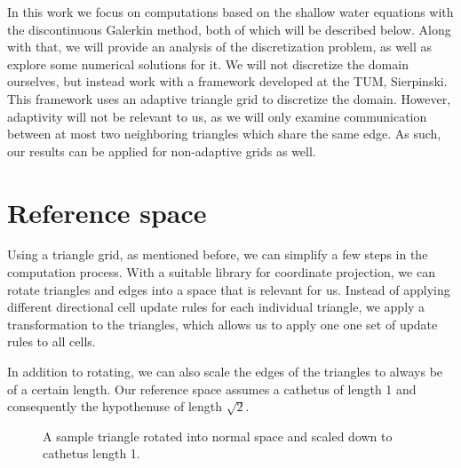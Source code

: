 \documentclass{article}
\begin{document}
In this work we focus on computations based on the shallow water equations with the discontinuous Galerkin method, both of which will be described below.
Along with that, we will provide an analysis of the discretization problem, as well as explore some numerical solutions for it.
We will not discretize the domain ourselves, but instead work with a framework developed at the TUM, Sierpinski.
This framework uses an adaptive triangle grid to discretize the domain.
However, adaptivity will not be relevant to us, as we will only examine communication between at most two neighboring triangles which share the same edge.
As such, our results can be applied for non-adaptive grids as well.

\section{Reference space}
\label{sec:reference-space}

Using a triangle grid, as mentioned before, we can simplify a few steps in the computation process.
With a suitable library for coordinate projection, we can rotate triangles and edges into a space that is relevant for us.
Instead of applying different directional cell update rules for each individual triangle, we apply a transformation to the triangles, which allows us to apply one one set of update rules to all cells.

In addition to rotating, we can also scale the edges of the triangles to always be of a certain length.
Our reference space assumes a cathetus of length 1 and consequently the hypothenuse of length $\sqrt{2}$.

\begin{figure}[ht]
  \centering
  \caption{A sample triangle rotated into normal space and scaled down to cathetus length 1.}
  \label{fig:triangle-projection}
\end{figure}
\end{document}
